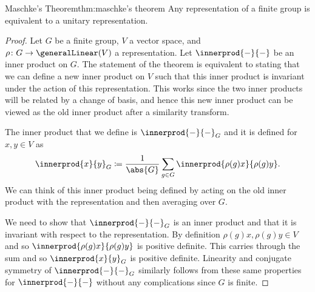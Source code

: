 \documentclass[fleqn]{NotesClass}
\begin{document}
    \begin{thm}{Maschke's Theorem}{thm:maschke's theorem}
        Any representation of a finite group is equivalent to a unitary representation.
        
        \begin{proof}
            Let \(G\) be a finite group, \(V\) a vector space, and \(\rho\colon G \to \generalLinear(V)\) a representation.
            Let \(\innerprod{-}{-}\) be an inner product on \(G\).
            The statement of the theorem is equivalent to stating that we can define a new inner product on \(V\) such that this inner product is invariant under the action of this representation.
            This works since the two inner products will be related by a change of basis, and hence this new inner product can be viewed as the old inner product after a similarity transform.
            
            The inner product that we define is \(\innerprod{-}{-}_G\) and it is defined for \(x, y \in V\) as
            \begin{equation}
                \innerprod{x}{y}_G \coloneqq \frac{1}{\abs{G}} \sum_{g \in G} \innerprod{\rho(g)x}{\rho(g)y}.
            \end{equation}
            We can think of this inner product being defined by acting on the old inner product with the representation and then averaging over \(G\).
            
            We need to show that \(\innerprod{-}{-}_G\) is an inner product and that it is invariant with respect to the representation.
            By definition \(\rho(g)x, \rho(g)y \in V\) and so \(\innerprod{\rho(g)x}{\rho(g)y}\) is positive definite.
            This carries through the sum and so \(\innerprod{x}{y}_G\) is positive definite.
            Linearity and conjugate symmetry of \(\innerprod{-}{-}_G\) similarly follows from these same properties for \(\innerprod{-}{-}\) without any complications since \(G\) is finite.
            

\end{proof}
\end{thm}
\end{document}
